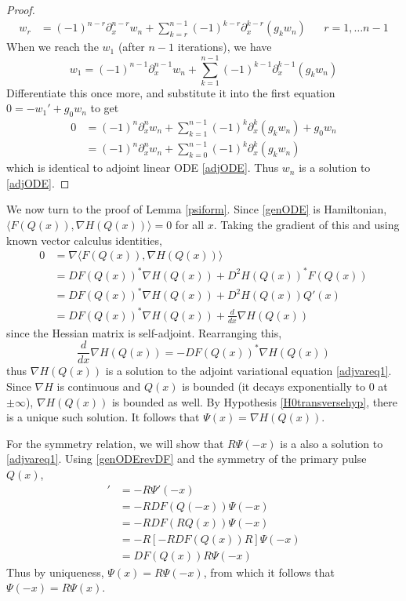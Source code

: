 \documentclass[thesis.tex]{subfiles}
\begin{document}
\begin{lemma}
\begin{proof}
\begin{align*}
w_r &= (-1)^{n-r} \partial_x^{n-r}w_n + \sum_{k=r}^{n-1} (-1)^{k-r} \partial_x^{k-r}(g_k w_n) && r = 1, \dots n-1
\end{align*}
When we reach the $w_1$ (after $n-1$ iterations), we have
\[
w_1 = (-1)^{n-1} \partial_x^{n-1} w_n + \sum_{k=1}^{n-1} (-1)^{k-1} \partial_x^{k-1}(g_k w_n)
\]
Differentiate this once more, and substitute it into the first equation $0 = -w_1' + g_0 w_n$ to get 
\begin{align*}
0 &= (-1)^{n} \partial_x^{n} w_n + \sum_{k=1}^{n-1} (-1)^{k} \partial_x^{k}(g_k w_n) + g_0 w_n \\
&= (-1)^{n} \partial_x^{n} w_n + \sum_{k=0}^{n-1} (-1)^{k} \partial_x^{k}(g_k w_n)
\end{align*}
which is identical to adjoint linear ODE \eqref{adjODE}. Thus $w_n$ is a solution to \eqref{adjODE}.
\end{proof}
\end{lemma}

We now turn to the proof of Lemma \ref{psiform}. Since \eqref{genODE} is Hamiltonian, $\langle F(Q(x)), \nabla H(Q(x)) \rangle = 0$ for all $x$. Taking the gradient of this and using known vector calculus identities,
\begin{align*}
0 &= \nabla \langle F(Q(x)), \nabla H(Q(x)) \rangle \\
&= D F(Q(x))^* \nabla H(Q(x)) + D^2 H(Q(x))^* F(Q(x)) \\
&= D F(Q(x))^* \nabla H(Q(x)) + D^2 H(Q(x)) Q'(x) \\
&= D F(Q(x))^* \nabla H(Q(x)) + \frac{d}{dx} \nabla H(Q(x))
\end{align*}
since the Hessian matrix is self-adjoint. Rearranging this,
\begin{equation*}
\frac{d}{dx} \nabla H(Q(x)) = -D F(Q(x))^* \nabla H(Q(x)) 
\end{equation*}
thus $\nabla H(Q(x))$ is a solution to the adjoint variational equation \eqref{adjvareq1}. Since $\nabla H$ is continuous and $Q(x)$ is bounded (it decays exponentially to 0 at $\pm \infty$), $\nabla H(Q(x))$ is bounded as well. By Hypothesis \cref{H0transversehyp}, there is a unique such solution. It follows that $\Psi(x) = \nabla H(Q(x))$.

For the symmetry relation, we will show that $R \Psi(-x)$ is a also a solution to \eqref{adjvareq1}. Using \eqref{genODErevDF} and the symmetry of the primary pulse $Q(x)$, 
\begin{align*}
[R \Psi(-x)]' &= -R \Psi'(-x) \\
&= -R DF(Q(-x)) \Psi(-x) \\
&= -R DF(RQ(x)) \Psi(-x) \\
&= -R [-RDF(Q(x))R] \Psi(-x) \\
&= DF(Q(x))R \Psi(-x)
\end{align*}
Thus by uniqueness, $\Psi(x) = R \Psi(-x)$, from which it follows that $\Psi(-x) = R \Psi(x)$.
\end{document}
